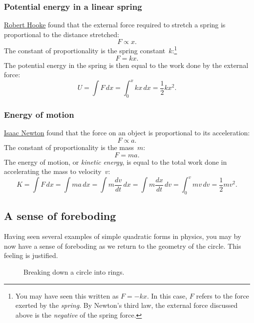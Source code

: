     \subsubsection{Potential energy in a linear spring} %
    \label{sec:potential_energy_in_a_linear_spring}

\href{http://en.wikipedia.org/wiki/Robert_Hooke}{Robert Hooke} found that the external force required to stretch a spring is proportional to the distance stretched:
\[ F \propto x. \]
The constant of proportionality is the spring constant~$k$:\footnote{You may have seen this written as $F = -kx$. In this case, $F$ refers to the force exerted by the \emph{spring}. By Newton's third law, the external force discussed above is the \emph{negative} of the spring force.}
\[ F = k x. \]
The potential energy in the spring is then equal to the work done by the external force:
\[ U = \int F\,dx = \int_0^x kx\,dx = \textstyle{\frac{1}{2}} kx^2. \]

    \subsubsection{Energy of motion} %
    \label{sec:energy_of_motion}

\href{http://en.wikipedia.org/wiki/Isaac_Newton}{Isaac Newton} found that the force on an object is proportional to its acceleration:
\[ F \propto a. \]
The constant of proportionality is the mass~$m$:
\[ F = m a. \]
The energy of motion, or \emph{kinetic energy}, is equal to the total work done in accelerating the mass to velocity~$v$:
\[ K = \int F\,dx = \int ma\,dx = \int m\frac{dv}{dt}\,dx = \int m\frac{dx}{dt}\,dv = \int_0^v mv\,dv = \textstyle{\frac{1}{2}} mv^2. \]

  \subsection{A sense of foreboding} %
  \label{sec:a_sense_of_foreboding}

Having seen several examples of simple quadratic forms in physics, you may by now have a sense of foreboding as we return to the geometry of the circle. This feeling is justified.

\begin{figure}
\begin{center}
\end{center}
\caption{Breaking down a circle into rings.\label{fig:circular_area}}
\end{figure}


